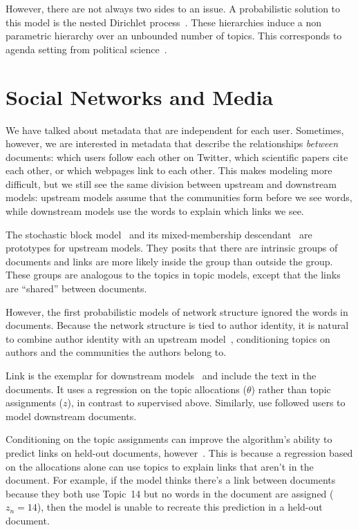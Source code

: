 
However, there are not always two sides to an issue.  A probabilistic
solution to this model is the nested Dirichlet
process~\citep{blei-07}.  These hierarchies induce a non parametric
hierarchy over an unbounded number of topics.  This corresponds to
agenda setting from political
science~\citep{Nguyen:Boyd-Graber:Resnik:Miler-2015}.



\section{Social Networks and Media}

We have talked about metadata that are independent for each user.
Sometimes, however, we are interested in metadata that describe the
relationships \emph{between} documents: which users follow each other
on Twitter, which scientific papers cite each other, or which webpages
link to each other.  This makes modeling more difficult, but we still
see the same division between upstream and downstream models: upstream
models assume that the communities form before we see words, while
downstream models use the words to explain which links we see.

The stochastic block model~\citep{holland-83} and its mixed-membership
descendant~\citep{airoldi-08} are prototypes for upstream models.
They posits that there are intrinsic groups of documents and links are
more likely inside the group than outside the group.  These groups are
analogous to the topics in topic models, except that the links are
``shared'' between documents.

However, the first probabilistic models of network structure ignored
the words in documents.  Because the network structure is tied to
author identity, it is natural to combine author identity with
an upstream model~\citet{mccallum-05b,liu-09}, conditioning topics on
authors and the communities the authors belong to.

Link  is the exemplar for downstream
models~\citep{nallapati-08} and include the text in the documents.  It
uses a regression on the topic allocations ($\theta$) rather than
topic assignments ($z$), in contrast to supervised  above.  Similarly, \citet{cha-12} use
followed users to model downstream documents.

Conditioning on the topic assignments can improve the algorithm's
ability to predict links on held-out documents,
however~\citep{chang-09a}.  This is because a regression based on the
allocations alone can use topics to explain links that aren't in the
document.  For example, if the model thinks there's a link between
documents because they both use Topic~14 but no words in the document
are assigned ($z_n=14$), then the model is unable to recreate this
prediction in a held-out document.  

